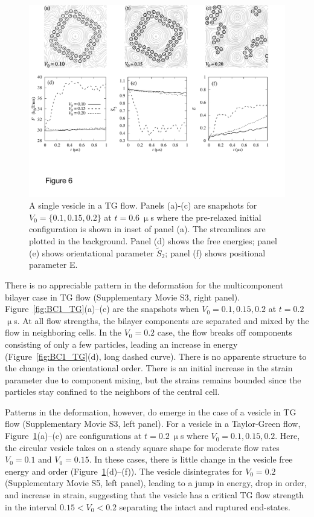 \documentclass[prb,preprint,showpacs,preprintnumbers,amsmath,amssymb,longbibliography]{revtex4-1}
\begin{document}
\begin{figure}
  \begin{center}
    \includegraphics[width=1.0\textwidth]{Figures/Figure6.pdf}        
  \end{center}
\caption{\label{fig:ves_TG} A single vesicle in a TG flow. Panels
  (a)-(c) are snapshots for $V_0=\{0.1, 0.15, 0.2\}$ at $t=0.6\ \upmu$s
  where the pre-relaxed initial configuration is shown in inset of panel
  (a). The streamlines are plotted in the background. Panel (d) shows
  the free energies; panel (e) shows orientational parameter
  $\tilde{S}_2$; panel (f) shows positional parameter E.}
\end{figure}


There is no appreciable pattern in the deformation for the
multicomponent bilayer case in TG flow
(Supplementary Movie S3, right panel).
Figure~\ref{fig:BC1_TG}(a)--(c)
are the snapshots when $V_0=0.1,0.15,0.2$ at $t = 0.2$ $\upmu$s. At all
flow strengths, the bilayer components are separated and mixed by the
flow in neighboring cells. In the $V_0 = 0.2$ case, the flow breaks off
components consisting of only a few particles, leading an increase in
energy (Figure~\ref{fig:BC1_TG}(d), long dashed curve). There is no
apparente structure to the change in the orientational order. There is an initial
increase in the strain parameter due to component mixing, but the
strains remains bounded since the particles stay confined to the
neighbors of the central cell.


Patterns in the deformation, however, do emerge in the case of a vesicle
in TG flow (Supplementary Movie S3, left panel). For a vesicle in a Taylor-Green flow,
Figure~\ref{fig:ves_TG}(a)--(c) are configurations at $t=0.2\ \upmu$s
where $V_0=0.1,0.15,0.2$. Here, the circular vesicle takes on a steady
square shape for moderate flow rates $V_0 = 0.1$ and $V_0 = 0.15$. In
these cases, there is little change in the vesicle free energy and order
(Figure~\ref{fig:ves_TG}(d)--(f)). The vesicle disintegrates for $V_0 =
0.2$ (Supplementary Movie S5, left panel), leading to a jump in energy, drop in order, and increase in
strain, suggesting that the vesicle has a critical TG flow strength in
the interval $0.15 < V_0 <  0.2$ separating the intact and ruptured
end-states.
\end{document}
